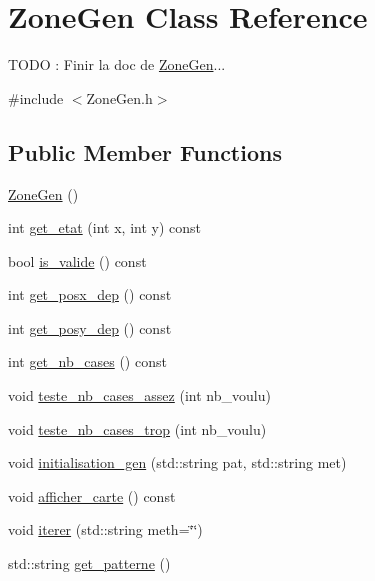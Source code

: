 \hypertarget{classZoneGen}{}\section{Zone\+Gen Class Reference}
\label{classZoneGen}


T\+O\+DO \+: Finir la doc de \hyperlink{classZoneGen}{Zone\+Gen}...  




{\ttfamily \#include $<$Zone\+Gen.\+h$>$}

\subsection*{Public Member Functions}
\begin{DoxyCompactItemize}
\item 
\hyperlink{classZoneGen_aae2af3fc6b6db23a7b1f7091115ef392}{Zone\+Gen} ()
\item 
int \hyperlink{classZoneGen_a893e3c5d0ae5ecc50bf19a5d90e89b45}{get\+\_\+etat} (int x, int y) const 
\item 
bool \hyperlink{classZoneGen_a0e073b705a18999388b0b85b7c11a080}{is\+\_\+valide} () const 
\item 
int \hyperlink{classZoneGen_ac64697de6f96b242b2fb191af66e1a30}{get\+\_\+posx\+\_\+dep} () const 
\item 
int \hyperlink{classZoneGen_aa8a3a729f5d2106dbb47f33aa4d8bc9a}{get\+\_\+posy\+\_\+dep} () const 
\item 
int \hyperlink{classZoneGen_a76588fc3a5d361a213ec28692b8abcdc}{get\+\_\+nb\+\_\+cases} () const 
\item 
void \hyperlink{classZoneGen_a881eb249ee86fa522c58e7f42f651c85}{teste\+\_\+nb\+\_\+cases\+\_\+assez} (int nb\+\_\+voulu)
\item 
void \hyperlink{classZoneGen_a47825d838930c2f8657044353767f222}{teste\+\_\+nb\+\_\+cases\+\_\+trop} (int nb\+\_\+voulu)
\item 
void \hyperlink{classZoneGen_aa08565e6eb38911c72143aacfced7b91}{initialisation\+\_\+gen} (std\+::string pat, std\+::string met)
\item 
void \hyperlink{classZoneGen_a79aa554fa5bee5bd1e0af2a1a505fa57}{afficher\+\_\+carte} () const 
\item 
void \hyperlink{classZoneGen_a63dfaff24d4686702b22937606da1e04}{iterer} (std\+::string meth=\char`\"{}\char`\"{})
\item 
std\+::string \hyperlink{classZoneGen_ab1d84dcb2654e8339cd325cf15fcf9ca}{get\+\_\+patterne} ()

\end{DoxyCompactItemize}
